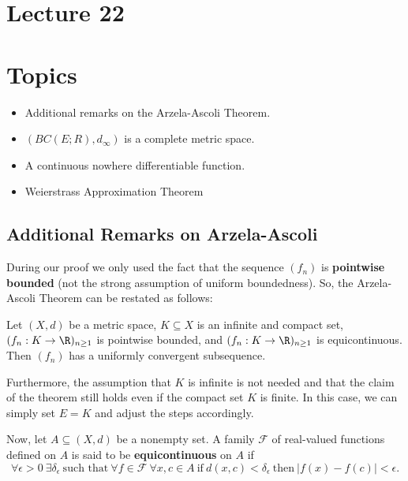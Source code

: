 \section{Lecture 22}

\section{Topics}

\begin{itemize}
    \item Additional remarks on the Arzela-Ascoli Theorem.
    \item  \( (BC(E; R), {d}_{\infty }) \) is a complete metric space. 
    \item A continuous nowhere differentiable function.
    \item Weierstrass Approximation Theorem
\end{itemize}

\subsection{Additional Remarks on Arzela-Ascoli}

During our proof we only used the fact that the sequence \( ({f}_{n}) \) is \textbf{pointwise bounded} (not the strong assumption of uniform boundedness). So, the Arzela-Ascoli Theorem can be restated as follows:

\begin{theorem}
    Let \( (X,d) \) be a metric space, \( K \subseteq  X   \) is an infinite and compact set, \( ({f}_{n}: K \to \R )_{n \geq 1 } \) is pointwise bounded, and \( ({f}_{n}: K \to \R )_{n \geq 1} \) is equicontinuous. Then \( ({f}_{n}) \) has a uniformly convergent subsequence.
\end{theorem}

Furthermore, the assumption that \( K  \) is infinite is not needed and that the claim of the theorem still holds even if the compact set \( K  \) is finite. In this case, we can simply set \( E = K  \) and adjust the steps accordingly. 

Now, let \( A \subseteq  (X,d)  \) be a nonempty set. A family \( \mathcal{F} \) of real-valued functions defined on \( A  \) is said to be \textbf{equicontinuous} on \( A  \) if 
\[  \forall \epsilon > 0  \ \exists {\delta}_{\epsilon} \ \text{such that} \ \forall f \in \mathcal{F} \ \forall x,c \in A \ \text{if} \ d(x,c) < {\delta}_{\epsilon} \ \text{then} \ | f(x) - f(c) | < \epsilon.   \] 

